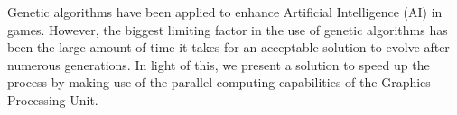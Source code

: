 \begin{thesisabstract}
Genetic algorithms have been applied to enhance Artificial Intelligence (AI) in
games. However, the biggest limiting factor in the use of genetic algorithms
has been the large amount of time it takes for an acceptable solution to evolve
after numerous generations. In light of this, we present a solution to speed up
the process by making use of the parallel computing capabilities of the Graphics
Processing Unit.
\end{thesisabstract}